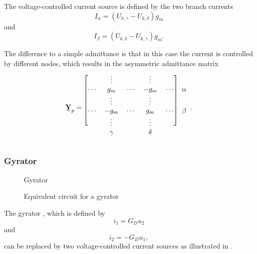 The voltage-controlled current source  is defined by the two branch currents
\begin{equation}
	I_\alpha = (U_{k,\gamma} - U_{k,\delta}) g_m
\end{equation}
and
\begin{equation}
	I_\beta = (U_{k,\delta} - U_{k,\gamma}) g_m.
\end{equation}

The difference to a simple admittance is that in this case the current is controlled by different nodes, which results in the asymmetric admittance matrix
\begin{equation}
	\mat Y_p = 	
	\begin{blockarray}{cccccc}
		\begin{block}{[ccccc]c}
		 		& \vdots	&			& \vdots	&			& \\
		\cdots	& g_m		& \cdots	& -g_m		& \cdots	& \alpha \\
		 		& \vdots	&			& \vdots	&			& \\
		\cdots	& -g_m		& \cdots	& g_m		& \cdots	& \beta \\
		 		& \vdots	&			& \vdots	&			& \\
		\end{block}
				& \gamma	&			& \delta	&			& 
	\end{blockarray}.
\end{equation}

\subsubsection{Gyrator}

\begin{figure}
	\centering
	
	\caption{Gyrator}
	\label{fig:gyrator_original}
\end{figure}

\begin{figure}
	\centering
	
	\caption{Equivalent circuit for a gyrator}
	\label{fig:gyrator_equivalent}
\end{figure}

The gyrator , which is defined by
\begin{equation}
	i_1 = G_D u_2
\end{equation}
and
\begin{equation}
	i_2 = -G_D u_1,
\end{equation}
can be replaced by two voltage-controlled current sources as illustrated in .

